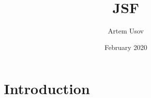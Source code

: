 \documentclass[10pt,a4paper,twocolumn]{article}
\title{JSF}
\author{Artem Usov}
\date{February 2020}
\begin{document}
\maketitle

\section{Introduction}
\end{document}
